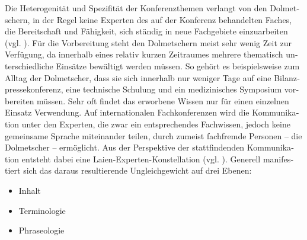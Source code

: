 \documentclass[output=paper]{LSP/langsci}
\begin{document}
\begin{otherlanguage}{ngerman}
Die Heterogenität und Spezifität der Konferenzthemen verlangt von den Dolmetschern, in der Regel keine Experten des auf der Konferenz behandelten Faches,  die Bereitschaft und Fähigkeit, sich ständig in neue Fachgebiete einzuarbeiten (vgl. \citealt{Kalina2007,Andres2011}). Für die Vorbereitung steht den Dolmetschern meist sehr wenig Zeit zur Verfügung, da innerhalb eines relativ kurzen Zeitraumes mehrere thematisch unterschiedliche Einsätze bewältigt werden müssen. So gehört es beispielsweise zum Alltag der Dolmetscher, dass sie sich innerhalb nur weniger Tage auf eine Bilanzpressekonferenz, eine technische Schulung und ein medizinisches Symposium vorbereiten müssen. Sehr oft findet das erworbene Wissen nur für einen einzelnen Einsatz Verwendung. Auf internationalen Fachkonferenzen wird die Kommunikation unter den Experten, die zwar ein entsprechendes Fachwissen, jedoch keine gemeinsame Sprache miteinander teilen, durch zumeist fachfremde Personen -- die Dolmetscher -- ermöglicht. Aus der Perspektive der stattfindenden Kommunikation entsteht dabei eine Laien-Experten-Konstellation (vgl. \citealt{Will2009}). Generell manifestiert sich das daraus resultierende Ungleichgewicht auf drei Ebenen:

\begin{itemize}
\item 
Inhalt
\item 
Terminologie
\item 
Phraseologie
\end{itemize}


\end{otherlanguage}
\end{document}
